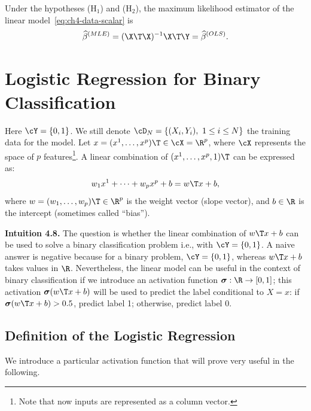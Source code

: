 \begin{proposition}
Under the hypotheses (H$_1$) and (H$_2$), the maximum likelihood estimator of the linear model~\eqref{eq:ch4-data-scalar} is
\begin{equation}\label{eq:ch4-mle-equals-ols}
\widehat{\beta}^{(MLE)} = (\X\T \X)^{-1} \X\T \Y = \widehat{\beta}^{(OLS)}.
\end{equation}
\end{proposition}

\section{Logistic Regression for Binary Classification}\label{sec:ch4-logistic}

Here $\cY = \{0, 1\}$. We still denote $\cD_N = \{(X_i, Y_i),\ 1 \le i \le N\}$ the training
data for the model. Let $x = (x^1, \ldots, x^p)\T \in \cX = \R^p$, where $\cX$ represents the
space of $p$ features\footnote{Note that now inputs are represented as a column vector.}. A linear combination of $(x^1, \ldots, x^p, 1)\T$ can be expressed as:
\begin{equation}\label{eq:ch4-linear-comb}
w_1 x^1 + \cdots + w_p x^p + b = w\T x + b,
\end{equation}
where $w = (w_1, \ldots, w_p)\T \in \R^p$ is the weight vector (slope vector), and $b \in \R$
is the intercept (sometimes called ``bias'').

\begin{tcolorbox}[remarkbox]
\textbf{Intuition 4.8.} The question is whether the linear combination of $w\T x + b$
can be used to solve a binary classification problem i.e., with $\cY = \{0, 1\}$. A naive answer is negative because for a binary
problem, $\cY = \{0, 1\}$, whereas $w\T x + b$ takes values in $\R$.
Nevertheless, the linear model can be useful in the context of binary
classification if we introduce an activation function $\boldsymbol{\sigma} : \R \to [0, 1]$; this
activation $\boldsymbol{\sigma}(w\T x + b)$ will be used to predict the label conditional to
$X = x$: if $\boldsymbol{\sigma}(w\T x + b) > 0.5$, predict label 1; otherwise, predict label 0.
\end{tcolorbox}

\subsection{Definition of the Logistic Regression}

We introduce a particular activation function that will prove very useful in the
following.

